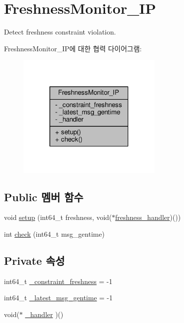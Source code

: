 \hypertarget{classFreshnessMonitor__IP}{}\section{Freshness\+Monitor\+\_\+\+IP}
\label{classFreshnessMonitor__IP}


Detect freshness constraint violation.  




Freshness\+Monitor\+\_\+\+I\+P에 대한 협력 다이어그램\+:\nopagebreak
\begin{figure}[H]
\begin{center}
\leavevmode
\includegraphics[width=199pt]{classFreshnessMonitor__IP__coll__graph}
\end{center}
\end{figure}
\subsection*{Public 멤버 함수}
\begin{DoxyCompactItemize}
\item 
void \hyperlink{classFreshnessMonitor__IP_a5270577609116294857dbd2192fade7d}{setup} (int64\+\_\+t freshness, void($\ast$\hyperlink{sample__main_8cpp_ae2b580f894f38496da91bce6c31e186f}{freshness\+\_\+handler})())
\item 
int \hyperlink{classFreshnessMonitor__IP_a0527f0f908800c340be5c987e699d0c2}{check} (int64\+\_\+t msg\+\_\+gentime)
\end{DoxyCompactItemize}
\subsection*{Private 속성}
\begin{DoxyCompactItemize}
\item 
int64\+\_\+t \hyperlink{classFreshnessMonitor__IP_ab8e71388a97033da7a0b883bf8f59d44}{\+\_\+constraint\+\_\+freshness} = -\/1
\item 
int64\+\_\+t \hyperlink{classFreshnessMonitor__IP_afb42e4e2c6e1ecc9c40095b513f2147a}{\+\_\+latest\+\_\+msg\+\_\+gentime} = -\/1
\item 
void($\ast$ \hyperlink{classFreshnessMonitor__IP_a299e67c2c338b3c576c712d0f10fc2f3}{\+\_\+handler} )()
\end{DoxyCompactItemize}



